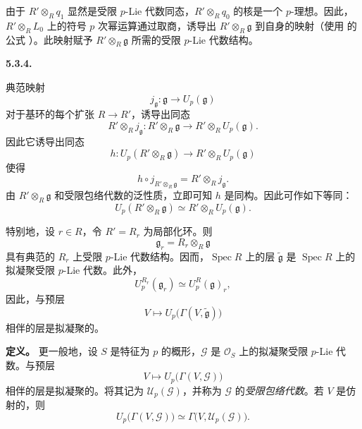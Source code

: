 由于 \(R'\otimes_Rq_1\) 显然是受限 \(p\)-Lie 代数同态，\(R'\otimes_Rq_0\) 的核是一个 \(p\)-理想。因此，\(R'\otimes_RL_0\) 上的符号 \(p\) 次幂运算通过取商，诱导出 \(R'\otimes_R\mathfrak g\) 到自身的映射（使用  的公式 ）。此映射赋予 \(R'\otimes_R\mathfrak g\) 所需的受限 \(p\)-Lie 代数结构。

\medskip
\noindent\textbf{5.3.4.}
\label{sga3:VIIA:5.3.4}

典范映射
\[
  j_{\mathfrak g}:\mathfrak g\longrightarrow U_p(\mathfrak g)
\]
对于基环的每个扩张 \(R\to R'\)，诱导出同态
\[
  R'\otimes_Rj_{\mathfrak g}:
  R'\otimes_R\mathfrak g
  \longrightarrow
  R'\otimes_RU_p(\mathfrak g).
\]
因此它诱导出同态
\[
  h:
  U_p(R'\otimes_R\mathfrak g)
  \longrightarrow
  R'\otimes_RU_p(\mathfrak g)
\]
使得
\[
  h\circ j_{R'\otimes_R\mathfrak g}
  =
  R'\otimes_Rj_{\mathfrak g}.
\]
由 \(R'\otimes_R\mathfrak g\) 和受限包络代数的泛性质，立即可知 \(h\) 是同构。因此可作如下等同：
\[
  U_p(R'\otimes_R\mathfrak g)
  \simeq
  R'\otimes_RU_p(\mathfrak g).
\]

特别地，设 \(r\in R\)，令 \(R'=R_r\) 为局部化环。则
\[
  \mathfrak g_r=R_r\otimes_R\mathfrak g
\]
具有典范的 \(R_r\) 上受限 \(p\)-Lie 代数结构。因而，\(\operatorname{Spec}R\) 上的层 \(\widetilde{\mathfrak g}\) 是 \(\operatorname{Spec}R\) 上的拟凝聚受限 \(p\)-Lie 代数。此外，
\[
  U_p^{R_r}(\mathfrak g_r)
  \simeq
  U_p^R(\mathfrak g)_r,
\]
因此，与预层
\[
  V\longmapsto
  U_p\bigl(\Gamma(V,\widetilde{\mathfrak g})\bigr)
\]
相伴的层是拟凝聚的。

\noindent\textbf{定义。}
更一般地，设 \(S\) 是特征为 \(p\) 的概形，\(\mathcal G\) 是 \(\mathcal O_S\) 上的拟凝聚受限 \(p\)-Lie 代数。与预层
\[
  V\longmapsto U_p\bigl(\Gamma(V,\mathcal G)\bigr)
\]
相伴的层是拟凝聚的。将其记为 \(\mathcal U_p(\mathcal G)\)，并称为 \(\mathcal G\) 的\emph{受限包络代数}。若 \(V\) 是仿射的，则
\[
  U_p\bigl(\Gamma(V,\mathcal G)\bigr)
  \simeq
  \Gamma\bigl(V,\mathcal U_p(\mathcal G)\bigr).
\]

